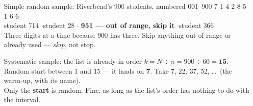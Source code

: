 \documentclass[aspectratio=169, 11pt]{beamer}
\newcommand{\redink}[1]{{\color{redacc}\bfseries #1}}
\begin{document}
\begin{frame}[t, plain]
  \vspace{2pt}
  \begin{block}{Simple random sample: Riverbend's 900 students, numbered 001--900}
    {\ttfamily\large 7 1 4  2 8  5 1  6 6}\\[4pt]
    student 714 \quad$\cdot$\quad student 28 \quad$\cdot$\quad
    \redink{951 --- out of range, skip it} \quad$\cdot$\quad student 366\\[2pt]
    {\small Three digits at a time because $900$ has three. Skip anything out of range or
    already used --- \emph{skip}, not stop.}
  \end{block}
  \vspace{4pt}
  \begin{block}{Systematic sample: the list is already in order}
    $k = N \div n = 900 \div 60 = \mathbf{15}$. Random start between 1 and 15 --- it lands on
    \textbf{7}. Take 7, 22, 37, 52, \dots\ (the warm-up, with its name).\\[2pt]
    {\small Only the \textbf{start} is random. Fine, as long as the list's order has nothing to
    do with the interval.}
  \end{block}
\end{frame}
\end{document}

